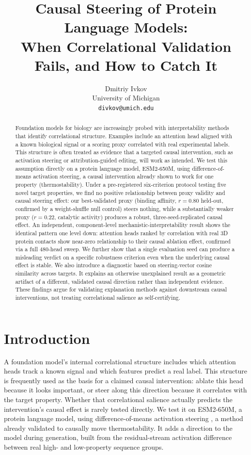 \documentclass{article}
\title{Causal Steering of Protein Language Models: \\
When Correlational Validation Fails, and How to Catch It}
\author{%
  Dmitriy Ivkov \\
  University of Michigan \\
  \texttt{divkov@umich.edu}
}
\begin{document}
\maketitle

\begin{abstract}
Foundation models for biology are increasingly probed with
interpretability methods that identify correlational structure. Examples
include an attention head aligned with a known biological signal or a
scoring proxy correlated with real experimental labels. This structure is
often treated as evidence that a targeted causal intervention, such as
activation steering or attribution-guided editing, will work as intended.
We test this
assumption directly on a protein language model, ESM2-650M, using
difference-of-means activation steering, a causal intervention already
shown to work for one property (thermostability). Under a pre-registered
six-criterion protocol testing five novel target properties, we find no
positive relationship between proxy validity and causal steering effect:
our best-validated proxy (binding affinity, $r=0.80$ held-out, confirmed
by a weight-shuffle null control) steers nothing, while a substantially
weaker proxy ($r=0.22$, catalytic activity) produces a robust,
three-seed-replicated causal effect. An independent, component-level
mechanistic-interpretability result shows the identical pattern one level
down: attention heads ranked by correlation with real 3D protein contacts
show near-zero relationship to their causal ablation effect, confirmed
via a full 480-head sweep. We further show that a single evaluation seed
can produce a misleading verdict on a specific robustness criterion even
when the underlying causal effect is stable. We also introduce a
diagnostic based on steering-vector cosine similarity across targets. It
explains an otherwise unexplained result as a geometric artifact of a
different, validated causal direction rather than independent evidence. These
findings argue for validating explanation methods against downstream
causal interventions, not treating correlational salience as
self-certifying.
\end{abstract}

\section{Introduction}

A foundation model's internal correlational structure includes which
attention heads track a known signal and which features predict a real
label. This structure is frequently used as the basis for a claimed
causal intervention: ablate this head because it looks important, or
steer along this direction because it correlates with the target
property. Whether that correlational
salience actually predicts the intervention's causal effect is rarely
tested directly. We test it on ESM2-650M, a protein language model, using
difference-of-means activation steering \citep{huang2025steering}, a
method already validated to causally move thermostability. It adds a
direction to the model during generation, built from the residual-stream
activation difference between real high- and low-property sequence
groups.
\end{document}

